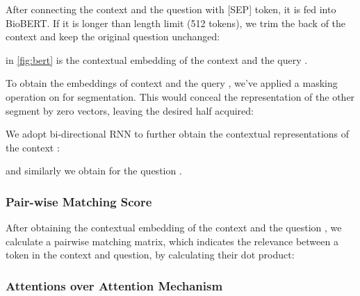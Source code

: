 \documentclass[sigconf, screen]{acmart}
\newcommand{\biobert}{Bio\-BERT\xspace}
\begin{document}
After connecting the context and the question with [SEP] token, it is fed into \biobert. If it is longer than length limit (512 tokens), we trim the back of the context and keep the original question unchanged:

 in \cref{fig:bert} is the contextual embedding of the context  and the query . 

To obtain the embeddings of context  and the query , we've applied a masking operation on  for segmentation. This would conceal the representation of the other segment by zero vectors, leaving the desired half acquired:


We adopt bi-directional RNN to further obtain the contextual representations  of the context :

and similarly we obtain  for the question .

\subsubsection{Pair-wise Matching Score}


After obtaining the contextual embedding of the context  and the question , we calculate a pairwise matching matrix, which indicates the relevance between a token in the context and question, by calculating their dot product:


\subsubsection{Attentions over Attention Mechanism}
\end{document}
